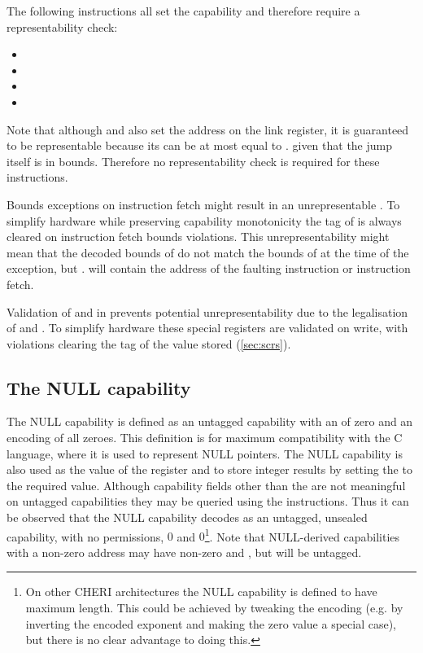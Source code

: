 The following instructions all set the capability \caddress{} and therefore require a representability check:
\begin{itemize}
  \item {}
  \item {}
  \item {}
  \item {}
\end{itemize}
Note that although  and  also set the address on the link register, it is guaranteed to be representable because its \caddress{} can be at most equal to \PCC{}.\ctop{} given that the jump itself is in bounds.
Therefore no representability check is required for these instructions.

Bounds exceptions on instruction fetch might result in an unrepresentable \MEPCC{}.
To simplify hardware while preserving capability monotonicity the tag of \MEPCC{} is always cleared on instruction fetch bounds violations.
This unrepresentability might mean that the decoded bounds of \MEPCC{} do not match the bounds of \PCC{} at the time of the exception,
but \MEPCC{}.\caddress{} will contain the address of the faulting instruction or instruction fetch.

Validation of \MTCC{} and \MEPCC{} in  prevents potential unrepresentability due to the legalisation of  and .
To simplify hardware these special registers are validated on write, with violations clearing the tag of the value stored (\cref{sec:scrs}).

\subsection{The NULL capability}
\label{sec:null}

The NULL capability is defined as an untagged capability with an \caddress{} of zero and an encoding of all zeroes.
This definition is for maximum compatibility with the C language, where it is used to represent NULL pointers.
The NULL capability is also used as the value of the  register and to store integer results by setting the \caddress{} to the required value.
Although capability fields other than the \caddress{} are not meaningful on untagged capabilities they may be queried using the  instructions.
Thus it can be observed that the NULL capability decodes as an untagged, unsealed capability, with no permissions, \cbase{} $0$ and \clength{} $0$\footnote{
  On other CHERI architectures the NULL capability is defined to have maximum length.
  This could be achieved by tweaking the encoding (e.g. by inverting the encoded exponent and making the zero value a special case), but there is no clear advantage to doing this.
}.
Note that NULL-derived capabilities with a non-zero address may have non-zero \cbase{} and \ctop{}, but will be untagged.


